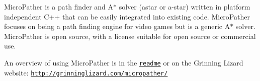 Micro\-Pather is a path finder and A$\ast$ solver (astar or a-\/star) written in platform independent C++ that can be easily integrated into existing code. Micro\-Pather focuses on being a path finding engine for video games but is a generic A$\ast$ solver. Micro\-Pather is open source, with a license suitable for open source or commercial use.

An overview of using Micro\-Pather is in the \href{../readme.htm}{\tt readme} or on the Grinning Lizard website\-: \href{http://grinninglizard.com/micropather/}{\tt http\-://grinninglizard.\-com/micropather/} 
